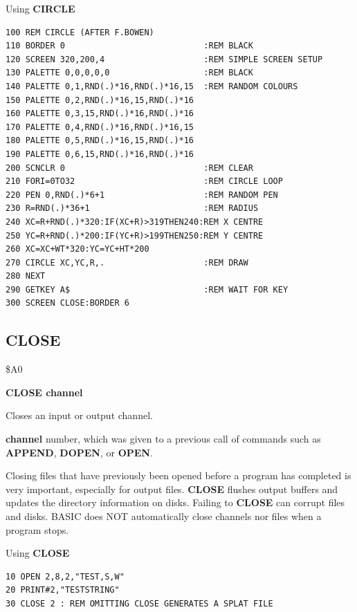 \begin{description}[leftmargin=2cm,style=nextline]
\item [Example:] Using {\bf CIRCLE}
\begin{tcolorbox}[colback=black,coltext=white]
\verbatimfont{\codefont}
\begin{verbatim}
100 REM CIRCLE (AFTER F.BOWEN)
110 BORDER 0                            :REM BLACK
120 SCREEN 320,200,4                    :REM SIMPLE SCREEN SETUP
130 PALETTE 0,0,0,0,0                   :REM BLACK
140 PALETTE 0,1,RND(.)*16,RND(.)*16,15  :REM RANDOM COLOURS
150 PALETTE 0,2,RND(.)*16,15,RND(.)*16
160 PALETTE 0,3,15,RND(.)*16,RND(.)*16
170 PALETTE 0,4,RND(.)*16,RND(.)*16,15
180 PALETTE 0,5,RND(.)*16,15,RND(.)*16
190 PALETTE 0,6,15,RND(.)*16,RND(.)*16
200 SCNCLR 0                            :REM CLEAR
210 FORI=0TO32                          :REM CIRCLE LOOP
220 PEN 0,RND(.)*6+1                    :REM RANDOM PEN
230 R=RND(.)*36+1                       :REM RADIUS
240 XC=R+RND(.)*320:IF(XC+R)>319THEN240:REM X CENTRE
250 YC=R+RND(.)*200:IF(YC+R)>199THEN250:REM Y CENTRE
260 XC=XC+WT*320:YC=YC+HT*200
270 CIRCLE XC,YC,R,.                    :REM DRAW
280 NEXT
290 GETKEY A$                           :REM WAIT FOR KEY
300 SCREEN CLOSE:BORDER 6
\end{verbatim}
\end{tcolorbox}
\end{description}


\newpage
\subsection{CLOSE}
\begin{description}[leftmargin=2cm,style=nextline]
\item [Token:] \$A0
\item [Format:] {\bf CLOSE channel}
\item [Usage:] Closes an input or output channel.

               {\bf channel} number, which was given to a previous
               call of commands such as {\bf APPEND}, {\bf DOPEN}, or {\bf OPEN}.

\item [Remarks:] Closing files that have previously been opened
               before a program has completed is
               very important, especially for output files.
               {\bf CLOSE} flushes output buffers and
               updates the directory information on disks.
               Failing to {\bf CLOSE} can corrupt files and disks.
               BASIC does NOT automatically close channels nor files
               when a program stops.

\item [Example:] Using {\bf CLOSE}
\begin{tcolorbox}[colback=black,coltext=white]
\verbatimfont{\codefont}
\begin{verbatim}
10 OPEN 2,8,2,"TEST,S,W"
20 PRINT#2,"TESTSTRING"
30 CLOSE 2 : REM OMITTING CLOSE GENERATES A SPLAT FILE
\end{verbatim}
\end{tcolorbox}
\end{description}

